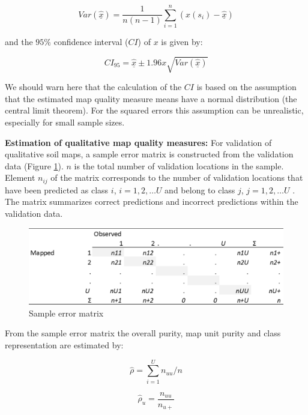 \documentclass[10pt,b5paper,]{book}
\theoremstyle{definition}
\theoremstyle{definition}
\theoremstyle{definition}
\theoremstyle{remark}
\begin{document}
\begin{equation}
Var(\underline{\hat{x}}) = \frac{1}{n(n-1)} \sum_{i=1}^{n} (x(s_i) -  \underline{\hat{x}})
\end{equation}

and the \(95\%\) confidence interval (\(CI\)) of \(x\) is given by:

\begin{equation}
CI_{95} = \underline{\hat{x}} \pm 1.96x\sqrt{Var(\underline{\hat{x}})}
\end{equation}

We should warn here that the calculation of the \(CI\) is based on the
assumption that the estimated map quality measure means have a normal
distribution (the central limit theorem). For the squared errors this
assumption can be unrealistic, especially for small sample sizes.

\textbf{Estimation of qualitative map quality measures:} For validation
of qualitative soil maps, a sample error matrix is constructed from the
validation data (Figure \ref{fig:errormatrix}). \(n\) is the total
number of validation locations in the sample. Element \(n_{ij}\) of the
matrix corresponds to the number of validation locations that have been
predicted as class \(i\), \(i = 1, 2, \dots U\) and belong to class
\(j\), \(j = 1, 2, \dots U\) \citep{lark1995components}. The matrix
summarizes correct predictions and incorrect predictions within the
validation data.

\begin{figure}
\includegraphics[width=0.8\linewidth]{images/Validation_error_matrix} \caption{Sample error matrix}\label{fig:errormatrix}
\end{figure}

From the sample error matrix the overall purity, map unit purity and
class representation are estimated by:

\begin{equation}
\hat{\rho} = \sum_{i=1}^{U} n_{uu} / n
\end{equation}

\begin{equation}
\hat{\rho}_u = \frac{ n_{uu}}{n_{u+}}
\end{equation}
\end{document}
